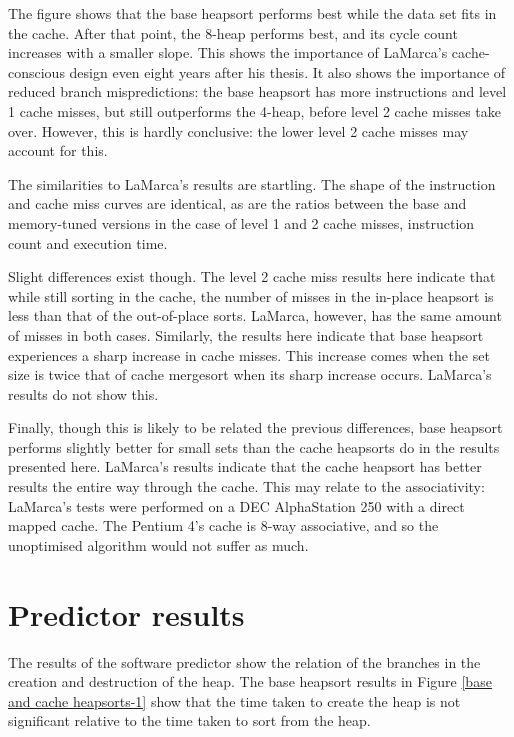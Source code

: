 The figure shows that the base heapsort performs best while the data set fits in
the cache. After that point, the 8-heap performs best, and its cycle count increases
with a smaller slope. This shows the importance of LaMarca's cache-conscious
design even eight years after his thesis. It also shows the importance of reduced
branch mispredictions: the base heapsort has more instructions and level 1 cache
misses, but still outperforms the 4-heap, before level 2 cache misses take over.
However, this is hardly conclusive: the lower level 2 cache misses may account
for this.

The similarities to LaMarca's results are startling. The shape of the
instruction and cache miss curves are identical, as are the ratios between the
base and memory-tuned versions in the case of level 1 and 2 cache misses,
instruction count and execution time.

Slight differences exist though. The level 2 cache miss results here indicate
that while still sorting in the cache, the number of misses in the in-place
heapsort is less than that of the out-of-place sorts. LaMarca, however, has the
same amount of misses in both cases. Similarly, the results here indicate that
base heapsort experiences a sharp increase in cache misses. This increase comes
when the set size is twice that of cache mergesort when its sharp increase
occurs. LaMarca's results do not show this.

Finally, though this is likely to be related the previous differences, base
heapsort performs slightly better for small sets than the cache heapsorts do in
the results presented here. LaMarca's results indicate that the cache heapsort
has better results the entire way through the cache. This may relate to the
associativity: LaMarca's tests were performed on a DEC AlphaStation 250 with a
direct mapped cache. The Pentium 4's cache is 8-way associative, and so the
unoptimised algorithm would not suffer as much.

\section{Predictor results}


The results of the software predictor show the relation of the branches
in the creation and destruction of the heap. The base heapsort results in
Figure \ref{base and cache heapsorts-1} show that the time taken to create the
heap is not significant relative to the time taken to sort from the heap.

